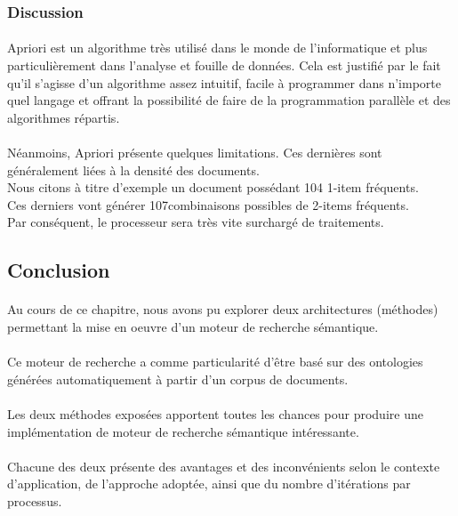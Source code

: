 \documentclass[12pt, a4paper, oneside]{book}
\begin{document}
\subsubsection{Discussion}

\paragraph{}
Apriori est un algorithme très utilisé dans le monde de l'informatique et plus particulièrement dans l'analyse et fouille de données.
Cela est justifié par le fait qu'il s'agisse d'un algorithme assez intuitif, facile à programmer dans n'importe quel langage et offrant la possibilité de faire de la programmation parallèle et des algorithmes répartis.
\paragraph{}
Néanmoins, Apriori présente quelques limitations. Ces dernières sont généralement liées à la densité des documents.\\
Nous citons à titre d'exemple un document possédant  104 1-item fréquents.\\
Ces derniers vont générer 107combinaisons possibles de 2-items fréquents.\\
Par conséquent, le processeur sera très vite surchargé de traitements.

\subsection{Conclusion}
\paragraph{}
Au cours de ce chapitre, nous avons pu explorer deux architectures (méthodes) permettant la mise en oeuvre d'un moteur de recherche sémantique.
\paragraph{}
Ce moteur de recherche a comme particularité d'être basé sur des ontologies générées automatiquement à partir d'un corpus de documents.
\paragraph{}
Les deux méthodes exposées apportent toutes les chances pour produire une implémentation de moteur de recherche sémantique intéressante.
\paragraph{}
Chacune des deux présente des avantages et des inconvénients selon le contexte d'application, de l'approche adoptée, ainsi que du nombre d'itérations par processus.
\end{document}
